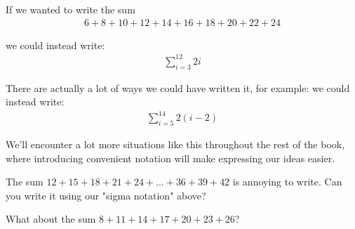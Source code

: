 If we wanted to write the sum
\begin{align*}
6 + 8 + 10 + 12 + 14 + 16 + 18 + 20 + 22 + 24
\end{align*}

we could instead write:
\begin{align*}
\sum_{i=3}^{12} 2i
\end{align*}

There are actually a lot of ways we could have written it, for example:
we could instead write:
\begin{align*}
\sum_{i=5}^{14} 2(i-2)
\end{align*}


We'll encounter a lot more situations like this throughout the rest of the book, where introducing convenient notation will make expressing our ideas easier.

\begin{exercise}
\label{sigma-notation-prac-1}
The sum $12 + 15 + 18 + 21 + 24 + ... + 36 + 39 + 42$ is annoying to write. Can you write it using our "sigma notation" above?
\end{exercise}

\begin{exercise}
\label{sigma-notation-prac-2}
What about the sum $8 + 11 + 14 + 17 + 20 + 23 + 26$?
\end{exercise}







